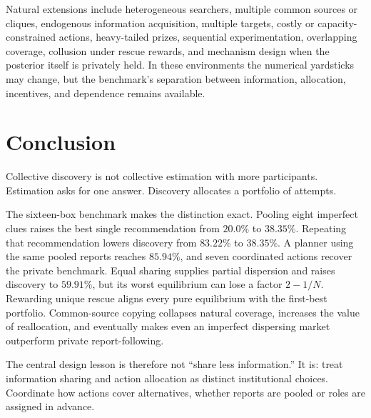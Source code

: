 \documentclass[11pt]{article}
\theoremstyle{definition}
\theoremstyle{remark}
\newcommand{\1}{\mathbf{1}}
\begin{document}
Natural extensions include heterogeneous searchers, multiple common sources or cliques, endogenous information acquisition, multiple targets, costly or capacity-constrained actions, heavy-tailed prizes, sequential experimentation, overlapping coverage, collusion under rescue rewards, and mechanism design when the posterior itself is privately held. In these environments the numerical yardsticks may change, but the benchmark's separation between information, allocation, incentives, and dependence remains available.

\section{Conclusion}

Collective discovery is not collective estimation with more participants. Estimation asks for one answer. Discovery allocates a portfolio of attempts.

The sixteen-box benchmark makes the distinction exact. Pooling eight imperfect clues raises the best single recommendation from $20.0\%$ to $38.35\%$. Repeating that recommendation lowers discovery from $83.22\%$ to $38.35\%$. A planner using the same pooled reports reaches $85.94\%$, and seven coordinated actions recover the private benchmark. Equal sharing supplies partial dispersion and raises discovery to $59.91\%$, but its worst equilibrium can lose a factor $2-1/N$. Rewarding unique rescue aligns every pure equilibrium with the first-best portfolio. Common-source copying collapses natural coverage, increases the value of reallocation, and eventually makes even an imperfect dispersing market outperform private report-following.

The central design lesson is therefore not ``share less information.'' It is: treat information sharing and action allocation as distinct institutional choices. Coordinate how actions cover alternatives, whether reports are pooled or roles are assigned in advance.


\setlength{\bibsep}{0.1em}

\end{document}
